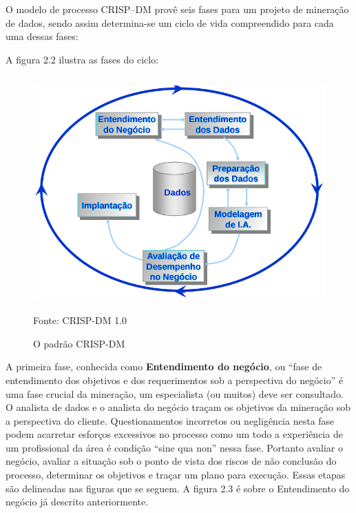 O modelo de processo CRISP--DM provê seis fases para um projeto de mineração de dados, sendo assim determina-se um ciclo de vida 
compreendido para cada uma dessas fases:

A figura 2.2 ilustra as fases do ciclo:

\begin{figure}[!ht]
\centering
\caption{O padrão CRISP-DM \cite{Crisp2000}}
\vspace{1mm}
\includegraphics[width=120mm, height=90mm]{Figuras/BigData/CrispDM2.png}\\
\tiny Fonte: CRISP-DM 1.0
\end{figure}

\vspace{0.5cm}

A primeira fase, conhecida como \textbf{Entendimento do negócio}, ou ``fase de entendimento dos objetivos e dos requerimentos sob a 
perspectiva do negócio'' \cite{Crisp2000} é uma fase crucial da mineração,  um especialista (ou muitos) deve ser consultado. 
O analista de dados e o analista do negócio traçam os objetivos da mineração sob a perspectiva do cliente. Questionamentos incorretos 
ou negligência nesta fase podem acarretar esforços excessivos no processo como um todo a experiência de um profissional da área 
é condição ``sine qua non'' nessa fase. Portanto avaliar o negócio, avaliar a situação sob o ponto de vista dos riscos de não conclusão 
do processo, determinar os objetivos e traçar um plano para execução. Essas etapas são delineadas nas figuras que se seguem. A figura 2.3 é sobre o Entendimento do negócio já descrito anteriormente.

\vspace{0.5cm}

